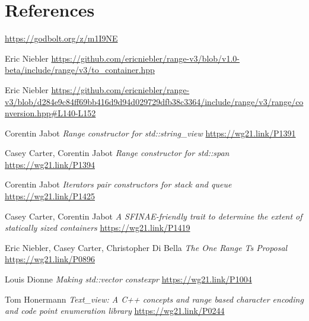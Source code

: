\documentclass{wg21}
\begin{document}
\section{References}
\renewcommand{\section}[2]{}%
\begin{thebibliography}{9}
	
	\url{https://godbolt.org/z/m1I9NE}

    Eric Niebler
	\url{https://github.com/ericniebler/range-v3/blob/v1.0-beta/include/range/v3/to_container.hpp}
	
Eric Niebler
\url{https://github.com/ericniebler/range-v3/blob/d284e9c84ff69bb416d9d94d029729dfb38c3364/include/range/v3/range/conversion.hpp#L140-L152}
	
	Corentin Jabot
	\emph{Range constructor for std::string\_view}\newline
	\url{https://wg21.link/P1391}
	
	Casey Carter, Corentin Jabot
	\emph{Range constructor for std::span}\newline
	\url{https://wg21.link/P1394}
	
	Corentin Jabot
	\emph{Iterators pair constructors for stack and queue}\newline
	\url{https://wg21.link/P1425}

	Casey Carter, Corentin Jabot
	\emph{A SFINAE-friendly trait to determine the extent of statically sized containers}\newline
	\url{https://wg21.link/P1419}

    Eric Niebler, Casey Carter, Christopher Di Bella
    \emph{The One Range Ts Proposal}\newline
    \url{https://wg21.link/P0896}

    Louis Dionne
    \emph{Making std::vector constexpr}\newline
    \url{https://wg21.link/P1004}

    Tom Honermann
    \emph{Text_view: A C++ concepts and range based character encoding and code point enumeration library}\newline
    \url{https://wg21.link/P0244}


\end{thebibliography}
\end{document}
